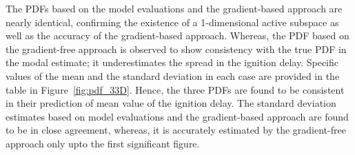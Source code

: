 %
%
%
The PDFs based on the model evaluations and the gradient-based approach are nearly identical, confirming
the existence of a 1-dimensional active subspace as well as the accuracy of the gradient-based approach. 
Whereas, the PDF based on the gradient-free approach is observed to show consistency with the true PDF in the modal
estimate; it underestimates the spread in the ignition delay. Specific values of the mean and the standard deviation
in each case are provided in the table in Figure~\ref{fig:pdf_33D}. Hence, the three PDFs are found to be
consistent in their prediction of mean value of the ignition delay.  The standard deviation estimates based on model
evaluations and the gradient-based approach are found to be in close agreement, whereas, it  is accurately estimated
by the gradient-free approach only upto the first significant figure. 































